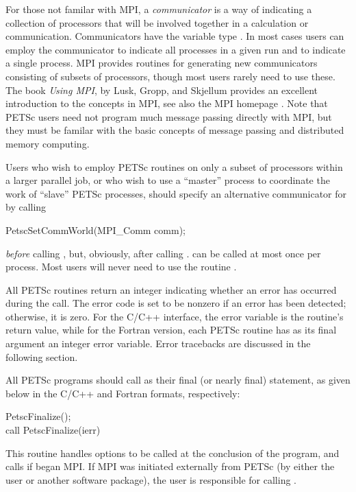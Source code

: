 For those not familar with MPI, a {\em communicator} is a way of
indicating a collection of processors that will be involved together
in a calculation or communication. Communicators have the variable type
. In most cases users can employ the communicator  to indicate all processes in a given run and  to indicate a single process. MPI provides routines
for generating new communicators consisting of subsets of processors,
though most users rarely need to use these. The book {\em Using MPI},
by Lusk, Gropp, and Skjellum \cite{using-mpi} provides an excellent
introduction to the concepts in MPI, see also the MPI homepage 
.
Note that PETSc users need not program much message passing directly
with MPI, but they must be familar with the basic concepts of message
passing and distributed memory computing.

Users who wish to employ PETSc routines on only a subset
of processors within a larger parallel job, or who wish to use a
``master'' process to coordinate the work of ``slave'' PETSc
processes, should specify an alternative communicator for  by calling 
\begin{tabbing}
  PetscSetCommWorld(MPI\_Comm comm);
\end{tabbing}
{\em before} calling , but, obviously, after
calling .  can be called
at most once per process. Most users will never need to use the routine
.

All PETSc routines return an integer indicating whether an error has
occurred during the call.  The error code is set to be nonzero if an
error has been detected; otherwise, it is zero.  For the C/C++
interface, the error variable is the routine's return value, while for
the Fortran version, each PETSc routine has as its final argument an
integer error variable.  Error tracebacks are discussed in the following
section.

All PETSc programs should call  
as their final (or nearly final) statement, as given below in the C/C++
and Fortran formats, respectively:
\begin{tabbing}
  PetscFinalize();\\
  call PetscFinalize(ierr)
\end{tabbing}
This routine handles options to be called at the conclusion of
the program, and calls  
if 
began MPI. If MPI was initiated externally from PETSc (by either
the user or another software package), the user is
responsible for calling . 

